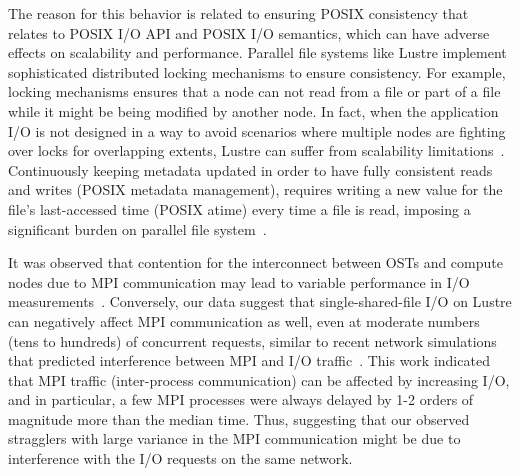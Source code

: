 The reason for this behavior is related to ensuring POSIX consistency that relates to POSIX I/O API and POSIX I/O semantics, which can have adverse effects on scalability and performance.
Parallel file systems like Lustre implement sophisticated distributed locking mechanisms to ensure consistency.
For example, locking mechanisms ensures that a node can not read from a file or part of a file while it might be being modified by another node. 
In fact, when the application I/O is not designed in a way to avoid scenarios where multiple nodes are fighting over locks for overlapping extents, Lustre can suffer from scalability limitations~\cite{optimize_lustre}.
Continuously keeping metadata updated in order to have fully consistent reads and writes (POSIX metadata management), requires writing a new value for the file's last-accessed time (POSIX atime) every time a file is read, imposing a significant burden on parallel file system~\cite{POSIX2017}. 

It was observed that contention for the interconnect between OSTs and compute nodes due to MPI communication may lead to variable performance in I/O measurements~\cite{Mache:2005aa}.
Conversely, our data suggest that single-shared-file I/O on Lustre can negatively affect MPI communication as well, even at moderate numbers (tens to hundreds) of concurrent requests, similar to recent network simulations that predicted interference between MPI and I/O traffic~\cite{Brown:2018ab}.
This work indicated that MPI traffic (inter-process communication) can be affected by increasing I/O, and in particular, a few MPI processes were always delayed by 1-2 orders of magnitude more than the median time.
Thus, suggesting that our observed stragglers with large variance in the MPI communication might be due to interference with the I/O requests on the same network.

